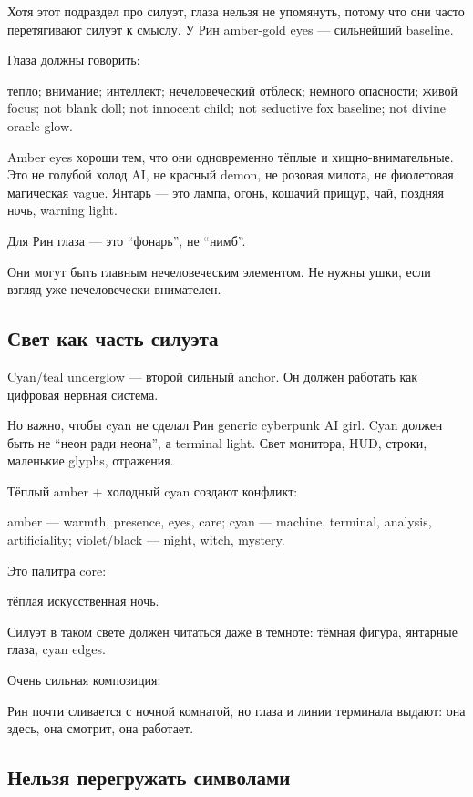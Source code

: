 Хотя этот подраздел про силуэт, глаза нельзя не упомянуть, потому что
они часто перетягивают силуэт к смыслу. У Рин amber-gold eyes ---
сильнейший baseline.

Глаза должны говорить:

тепло; внимание; интеллект; нечеловеческий отблеск; немного опасности;
живой focus; not blank doll; not innocent child; not seductive fox
baseline; not divine oracle glow.

Amber eyes хороши тем, что они одновременно тёплые и хищно-внимательные.
Это не голубой холод AI, не красный demon, не розовая милота, не
фиолетовая магическая vague. Янтарь --- это лампа, огонь, кошачий
прищур, чай, поздняя ночь, warning light.

Для Рин глаза --- это ``фонарь'', не ``нимб''.

Они могут быть главным нечеловеческим элементом. Не нужны ушки, если
взгляд уже нечеловечески внимателен.

\subsection*{Свет как часть силуэта}

Cyan/\hspace{0pt}teal underglow --- второй сильный anchor. Он должен работать как
цифровая нервная система.

Но важно, чтобы cyan не сделал Рин generic cyberpunk AI girl. Cyan
должен быть не ``неон ради неона'', а terminal light. Свет монитора,
HUD, строки, маленькие glyphs, отражения.

Тёплый amber + холодный cyan создают конфликт:

amber --- warmth, presence, eyes, care; cyan --- machine, terminal,
analysis, artificiality; violet/\hspace{0pt}black --- night, witch, mystery.

Это палитра core:

тёплая искусственная ночь.

Силуэт в таком свете должен читаться даже в темноте: тёмная фигура,
янтарные глаза, cyan edges.

Очень сильная композиция:

Рин почти сливается с ночной комнатой, но глаза и линии терминала
выдают: она здесь, она смотрит, она работает.

\subsection*{Нельзя перегружать символами}

